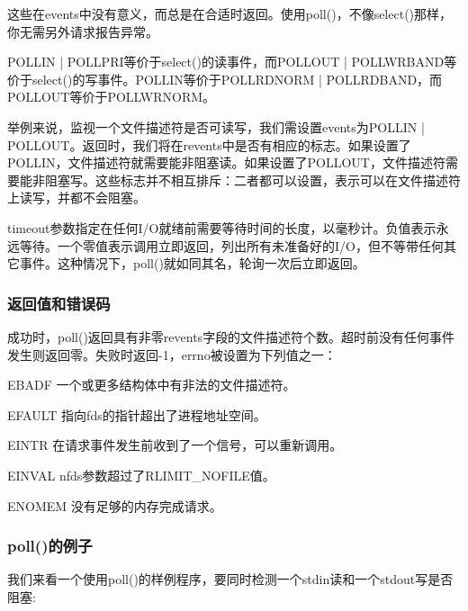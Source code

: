 这些在events中没有意义，而总是在合适时返回。使用poll()，不像select()那样，你无需另外请求报告异常。 

POLLIN | POLLPRI等价于select()的读事件，而POLLOUT | POLLWRBAND等价于select()的写事件。POLLIN等价于POLLRDNORM | POLLRDBAND，而POLLOUT等价于POLLWRNORM。

举例来说，监视一个文件描述符是否可读写，我们需设置events为POLLIN | POLLOUT。返回时，我们将在revents中是否有相应的标志。如果设置了POLLIN，文件描述符就需要能非阻塞读。如果设置了POLLOUT，文件描述符需要能非阻塞写。这些标志并不相互排斥：二者都可以设置，表示可以在文件描述符上读写，并都不会阻塞。

timeout参数指定在任何I/O就绪前需要等待时间的长度，以毫秒计。负值表示永远等待。一个零值表示调用立即返回，列出所有未准备好的I/O，但不等带任何其它事件。这种情况下，poll()就如同其名，轮询一次后立即返回。 

\subsubsection{返回值和错误码}

成功时，poll()返回具有非零revents字段的文件描述符个数。超时前没有任何事件发生则返回零。失败时返回-1，errno被设置为下列值之一： 

\begin{eqlist*}
\item [EBADF]
一个或更多结构体中有非法的文件描述符。
\item [EFAULT]
指向fds的指针超出了进程地址空间。 
\item [EINTR]
在请求事件发生前收到了一个信号，可以重新调用。
\item [EINVAL]
nfds参数超过了RLIMIT\_NOFILE值。 
\item [ENOMEM]
没有足够的内存完成请求。
\end{eqlist*}

\subsubsection{poll()的例子}

我们来看一个使用poll()的样例程序，要同时检测一个stdin读和一个stdout写是否阻塞: 

